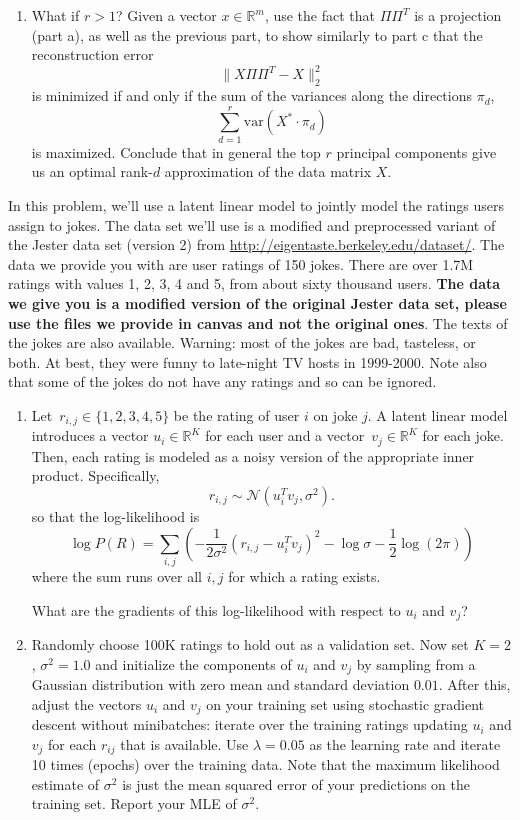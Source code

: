 \documentclass{harvardml}
\newcommand{\R}{\mathbb{R}}
\newcommand{\var}{\text{var}}
\theoremstyle{plain}
\begin{document}
\begin{problem}
\begin{enumerate}[label=(\alph*)]
\item
What if $r > 1$? Given a vector $x \in \R^m$, use the fact that $\Pi \Pi^T$ is a projection (part a), as well as the previous part, to show similarly to part c that the reconstruction error
\[
\| X \Pi \Pi^T - X \|_2^2
\]
is minimized if and only if the sum of the variances along the directions $\pi_d$,
\[
\sum_{d=1}^r \var(X^* \cdot \pi_d)
\]
is maximized. Conclude that in general the top $r$ principal components give us an optimal rank-$d$ approximation of the data matrix $X$.
\end{enumerate}
\end{problem}


\begin{problem}
In this problem, we'll use a latent linear model to jointly model the ratings
users assign to jokes. The data set we'll use is a modified and preprocessed
variant of the Jester data set (version 2) from
\url{http://eigentaste.berkeley.edu/dataset/}. The data we provide you with are user
ratings of 150 jokes. There are over 1.7M ratings with values 1, 2, 3, 4 and 5,
from about sixty thousand users. {\bf The data we give you is a modified version of the original Jester data set,
please use the files we provide in canvas and not the original ones}. The texts of the jokes are also available.
Warning: most of the jokes are bad, tasteless, or both. At best, they were
funny to late-night TV hosts in 1999-2000. Note also that some of the jokes do
not have any ratings and so can be ignored.

\begin{enumerate}[label=(\alph*)]
\item
Let~${r_{i,j}\in\{1,2,3,4,5\}}$ be the rating of user $i$ on joke $j$.  A latent linear model introduces a vector ${u_i\in\R^K}$ for each user and a vector~${v_j\in\R^K}$ for each joke.  Then, each rating is modeled as a noisy version of the appropriate inner product. Specifically,
\[
r_{i,j} \sim \mathcal{N}(u_i^T v_j, \sigma^2).
\]
so that the log-likelihood is
\[
\log P(R) = \sum_{i,j} \left( -\frac{1}{2\sigma^2} \left( r_{i,j} - u_i^T v_j \right)^2 - \log \sigma - \frac{1}{2} \log(2\pi) \right)
\]
where the sum runs over all $i,j$ for which a rating exists.

What are the gradients of this log-likelihood with respect to $u_i$ and $v_j$?

\item
Randomly choose 100K ratings to hold out as a validation set. Now set $K = 2$,
$\sigma^2=1.0$ and initialize the components of $u_i$ and $v_j$ by sampling from
a Gaussian distribution with zero mean and standard deviation $0.01$.  After
this, adjust the vectors $u_i$ and $v_j$ on your training set using stochastic
gradient descent without minibatches: iterate over the training ratings
updating $u_i$ and $v_j$ for each $r_{ij}$ that is available. Use $\lambda =
0.05$ as the learning rate and iterate 10 times (epochs) over the training
data. Note that the maximum likelihood estimate of $\sigma^2$ is just the mean
squared error of your predictions on the training set. Report your MLE of
$\sigma^2$.


\end{enumerate}
\end{problem}
\end{document}
